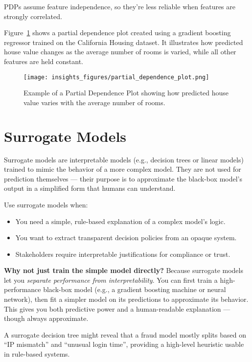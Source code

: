 \documentclass[12pt,openany]{book}
\begin{document}
\begin{notebox}
PDPs assume feature independence, so they're less reliable when features are strongly correlated.
\end{notebox}

Figure~\ref{fig:partial-dependence} shows a partial dependence plot created using a gradient boosting regressor trained on the California Housing dataset. It illustrates how predicted house value changes as the average number of rooms is varied, while all other features are held constant.


\begin{figure}[H]
    \centering
    \texttt{[image: insights\_figures/partial\_dependence\_plot.png]}
    \caption{Example of a Partial Dependence Plot showing how predicted house value varies with the average number of rooms.}
    \label{fig:partial-dependence}
\end{figure}


\section{Surrogate Models}

Surrogate models are interpretable models (e.g., decision trees or linear models) trained to mimic the behavior of a more complex model. They are not used for prediction themselves — their purpose is to approximate the black-box model’s output in a simplified form that humans can understand.

Use surrogate models when:
\begin{itemize}
  \item You need a simple, rule-based explanation of a complex model’s logic.
  \item You want to extract transparent decision policies from an opaque system.
  \item Stakeholders require interpretable justifications for compliance or trust.
\end{itemize}

\textbf{Why not just train the simple model directly?} Because surrogate models let you \textit{separate performance from interpretability}. You can first train a high-performance black-box model (e.g., a gradient boosting machine or neural network), then fit a simpler model on its predictions to approximate its behavior. This gives you both predictive power and a human-readable explanation — though always approximate.

\begin{examplebox}
A surrogate decision tree might reveal that a fraud model mostly splits based on ``IP mismatch'' and ``unusual login time'', providing a high-level heuristic usable in rule-based systems.
\end{examplebox}
\end{document}

